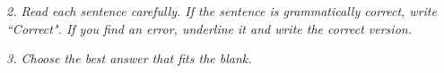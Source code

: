 \documentclass{exam}
\begin{document}
%
%
%
%
%
%
%
%
%
%
%
%
%
%
%
%
%
%
%
%

 \noindent \textit{2. Read each sentence carefully. If the sentence is grammatically correct, write ``Correct". If you find an error, underline it and write the correct version.}

%
%
%
%
%
%
%
%
%
%
%
%
%
%
%
%
%
%
%
%

\noindent \textit{3. Choose the best answer that fits the blank.}

%
%
%
%
%
%
%
%
%
%
%
%
%
%
%
%
%
%
%
%
\end{document}

